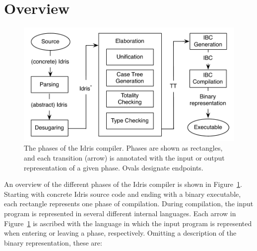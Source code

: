 \section{Overview}
\begin{figure}
\includegraphics[scale=0.9]{figures/Idris-overview}
\caption{The phases of the Idris compiler. Phases are shown as rectangles, and
  each transition (arrow) is annotated with the input or output representation
  of a given phase. Ovals designate endpoints.}
\label{fig:idris-overview}
\end{figure}
An overview of the different phases of the Idris compiler is shown in
Figure~\ref{fig:idris-overview}. Starting with concrete Idris source code and
ending with a binary executable, each rectangle represents one phase of
compilation. During compilation, the input program is represented in several
different internal languages. Each arrow in Figure~\ref{fig:idris-overview}
is ascribed with the language in which the input program is represented when entering
or leaving a phase, respectively. Omitting a description of the binary representation, these are:
